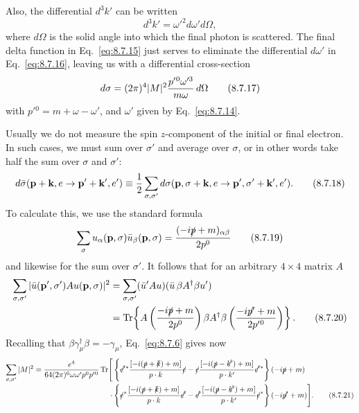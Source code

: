 Also, the differential $d^3k'$ can be written
\begin{equation}
d^3k'=\omega'^2d\omega' d\Omega,
\tag{8.7.16}\label{eq:8.7.16}
\end{equation}
where $d\Omega$ is the solid angle into which the final photon is scattered.
The final delta function in Eq.~\eqref{eq:8.7.15} just serves to eliminate the
differential $d\omega'$ in Eq.~\eqref{eq:8.7.16}, leaving us with a differential
cross-section
\begin{equation}
d\sigma=(2\pi)^4|M|^2{p'{}^0\omega'^3\over m\omega}\,d\Omega
\tag{8.7.17}\label{eq:8.7.17}
\end{equation}
with $p'{}^0=m+\omega-\omega'$, and $\omega'$ given by Eq.~\eqref{eq:8.7.14}.

Usually we do not measure the spin $z$-component of the initial or final
electron. In such cases, we must sum over $\sigma'$ and average over $\sigma$,
or in other words take half the sum over $\sigma$ and $\sigma'$:
\begin{equation}
d\bar\sigma(\mathbf p+\mathbf k,e\to\mathbf p'+\mathbf k',e')
\equiv{1\over2}\sum_{\sigma,\sigma'}d\sigma(\mathbf p,\sigma+\mathbf k,e
\to\mathbf p',\sigma'+\mathbf k',e').
\tag{8.7.18}\label{eq:8.7.18}
\end{equation}
To calculate this, we use the standard formula
\begin{equation}
\sum_\sigma u_\alpha(\mathbf p,\sigma)\bar u_\beta(\mathbf p,\sigma)
={(-i\sl{p}+m)_{\alpha\beta}\over2p^0}
\tag{8.7.19}\label{eq:8.7.19}
\end{equation}
and likewise for the sum over $\sigma'$. It follows that for an arbitrary
$4\times4$ matrix $A$
\begin{align}
\sum_{\sigma,\sigma'}|\bar u(\mathbf p',\sigma')Au(\mathbf p,\sigma)|^2
&=\sum_{\sigma,\sigma'}(\bar u'A u)(\bar u\,\beta A^\dagger\beta u')
\notag\\
&=\operatorname{Tr}\!\left\{A\left({-i\sl{p}+m\over2p^0}\right)
\beta A^\dagger\beta\left({-i\sl{p'}+m\over2p'{}^0}\right)\right\}.
\tag{8.7.20}\label{eq:8.7.20}
\end{align}
Recalling that $\beta\gamma_\mu^\dagger\beta=-\gamma_\mu$, Eq.~\eqref{eq:8.7.6}
gives now
\begingroup\small
\begin{align}
\sum_{\sigma,\sigma'}|M|^2
={e^4\over64(2\pi)^6\omega\omega'p^0p'{}^0}
\operatorname{Tr}\Biggl[
&\left\{\sl{e'}{}^*
 {[-i(\sl{p}+\sl{k})+m]\over p\cdot k}\sl{e}
-\sl{e}{[-i(\sl{p}-\sl{k'})+m]\over p\cdot k'}\sl{e'}{}^*\right\}
(-i\sl{p}+m)
\notag\\[-2pt]
\cdot&\left\{\sl{e}^*{[-i(\sl{p}+\sl{k})+m]\over p\cdot k}\sl{e'}
-\sl{e'}{[-i(\sl{p}-\sl{k'})+m]\over p\cdot k'}\sl{e}^*\right\}
(-i\sl{p'}+m)\Biggr].
\tag{8.7.21}\label{eq:8.7.21}
\end{align}
